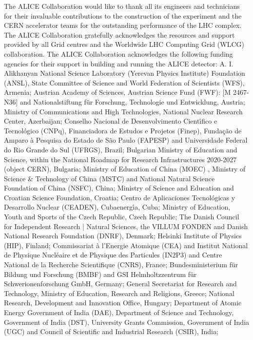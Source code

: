 
The ALICE Collaboration would like to thank all its engineers and technicians for their invaluable contributions to the construction of the experiment and the CERN accelerator teams for the outstanding performance of the LHC complex.
%
The ALICE Collaboration gratefully acknowledges the resources and support provided by all Grid centres and the Worldwide LHC Computing Grid (WLCG) collaboration.
%
The ALICE Collaboration acknowledges the following funding agencies for their support in building and running the ALICE detector:
%
A. I. Alikhanyan National Science Laboratory (Yerevan Physics Institute) Foundation (ANSL), State Committee of Science and World Federation of Scientists (WFS), Armenia;
%
Austrian Academy of Sciences, Austrian Science Fund (FWF): [M 2467-N36] and Nationalstiftung f\"{u}r Forschung, Technologie und Entwicklung, Austria;
%
Ministry of Communications and High Technologies, National Nuclear Research Center, Azerbaijan;
%
Conselho Nacional de Desenvolvimento Cient\'{\i}fico e Tecnol\'{o}gico (CNPq), Financiadora de Estudos e Projetos (Finep), Funda\c{c}\~{a}o de Amparo \`{a} Pesquisa do Estado de S\~{a}o Paulo (FAPESP) and Universidade Federal do Rio Grande do Sul (UFRGS), Brazil;
%
Bulgarian Ministry of Education and Science, within the National Roadmap for Research Infrastructures 2020-2027 (object CERN), Bulgaria;
%
Ministry of Education of China (MOEC) , Ministry of Science \& Technology of China (MSTC) and National Natural Science Foundation of China (NSFC), China;
%
Ministry of Science and Education and Croatian Science Foundation, Croatia;
%
Centro de Aplicaciones Tecnol\'{o}gicas y Desarrollo Nuclear (CEADEN), Cubaenerg\'{\i}a, Cuba;
%
Ministry of Education, Youth and Sports of the Czech Republic, Czech Republic;
%
The Danish Council for Independent Research | Natural Sciences, the VILLUM FONDEN and Danish National Research Foundation (DNRF), Denmark;
%
Helsinki Institute of Physics (HIP), Finland;
%
Commissariat \`{a} l'Energie Atomique (CEA) and Institut National de Physique Nucl\'{e}aire et de Physique des Particules (IN2P3) and Centre National de la Recherche Scientifique (CNRS), France;
%
Bundesministerium f\"{u}r Bildung und Forschung (BMBF) and GSI Helmholtzzentrum f\"{u}r Schwerionenforschung GmbH, Germany;
%
General Secretariat for Research and Technology, Ministry of Education, Research and Religions, Greece;
%
National Research, Development and Innovation Office, Hungary;
%
Department of Atomic Energy Government of India (DAE), Department of Science and Technology, Government of India (DST), University Grants Commission, Government of India (UGC) and Council of Scientific and Industrial Research (CSIR), India;
